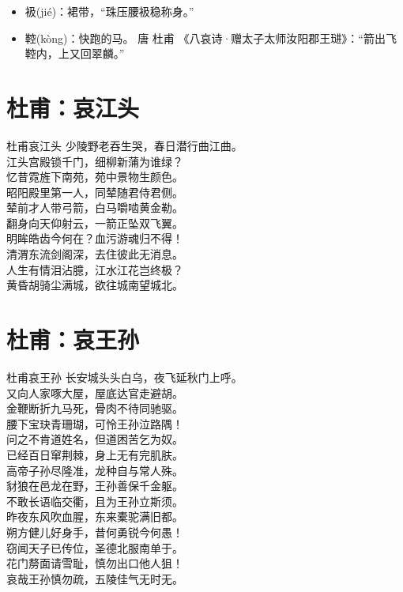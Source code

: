 \documentclass[12pt,oneside,a5paper]{book}
\begin{document}
\begin{itemize}
\item 衱(jié)：裙带，“珠压腰衱稳称身。”
\item 鞚(kòng)：快跑的马。 唐 杜甫 《八哀诗·赠太子太师汝阳郡王琎》：“箭出飞鞚内，上又回翠麟。”
\end{itemize}


\chapter{杜甫：哀江头}
\begin{poemzh}{杜甫}{哀江头}
少陵野老吞生哭，春日潜行曲江曲。\\
江头宫殿锁千门，细柳新蒲为谁绿？\\
忆昔霓旌下南苑，苑中景物生颜色。\\
昭阳殿里第一人，同辇随君侍君侧。\\
辇前才人带弓箭，白马嚼啮黄金勒。\\
翻身向天仰射云，一箭正坠双飞翼。\\
明眸皓齿今何在？血污游魂归不得！\\
清渭东流剑阁深，去住彼此无消息。\\
人生有情泪沾臆，江水江花岂终极？\\
黄昏胡骑尘满城，欲往城南望城北。\\ 
\end{poemzh}


\chapter{杜甫：哀王孙}
\begin{poemzh}{杜甫}{哀王孙}
长安城头头白乌，夜飞延秋门上呼。\\
又向人家啄大屋，屋底达官走避胡。\\
金鞭断折九马死，骨肉不待同驰驱。\\
腰下宝玦青珊瑚，可怜王孙泣路隅！\\
问之不肯道姓名，但道困苦乞为奴。\\
已经百日窜荆棘，身上无有完肌肤。\\
高帝子孙尽隆准，龙种自与常人殊。\\
豺狼在邑龙在野，王孙善保千金躯。\\
不敢长语临交衢，且为王孙立斯须。\\
昨夜东风吹血腥，东来橐驼满旧都。\\
朔方健儿好身手，昔何勇锐今何愚！\\
窃闻天子已传位，圣德北服南单于。\\
花门剺面请雪耻，慎勿出口他人狙！\\
哀哉王孙慎勿疏，五陵佳气无时无。\\ 
\end{poemzh}
\end{document}
